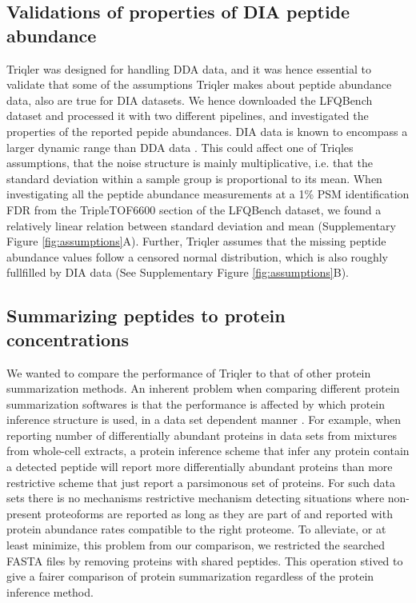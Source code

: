 \documentclass[10pt,letterpaper]{article}
\begin{document}
\subsection*{Validations of properties of DIA peptide abundance}

Triqler was designed for handling DDA data, and it was hence essential to validate that some of the assumptions Triqler makes about peptide abundance data, also are true for DIA datasets.
We hence downloaded the LFQBench dataset and processed it with two different pipelines, and investigated the properties of the reported pepide abundances. DIA data is known to encompass a larger dynamic range than DDA data . This could affect one of Triqles assumptions, that the noise structure is mainly multiplicative, i.e. that the standard deviation within a sample group is proportional to its mean. When investigating all the peptide abundance measurements at a 1\% PSM identification FDR from the TripleTOF6600 section of the LFQBench dataset, we found a relatively linear relation between standard deviation and mean (Supplementary Figure \ref{fig:assumptions}A). Further, Triqler assumes that the missing peptide abundance values follow a censored normal distribution, which is also roughly fullfilled by DIA data (See Supplementary Figure \ref{fig:assumptions}B).


\subsection*{Summarizing peptides to protein concentrations}

We wanted to compare the performance of Triqler to that of other protein summarization methods. An inherent problem when comparing different protein summarization softwares is that the performance is affected by which protein inference structure is used, in a data set dependent manner \cite{serang2012recognizing}. For example, when reporting number of differentially abundant proteins in data sets from mixtures from whole-cell extracts, a protein inference scheme that infer any protein contain a detected peptide will report more differentially abundant proteins than more restrictive scheme that just report a parsimonous set of proteins. For such data sets there is no mechanisms restrictive mechanism detecting situations where non-present proteoforms are reported as long as they are part of and reported with protein abundance rates compatible to the right proteome. To alleviate, or at least minimize, this problem from our comparison, we restricted the searched FASTA files by removing proteins with shared peptides. This operation stived to give a fairer comparison of protein summarization regardless of the protein inference method.
\end{document}
